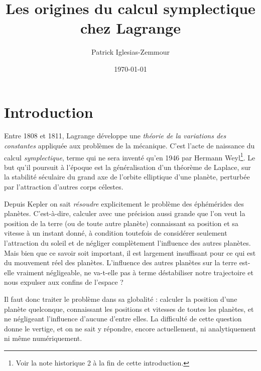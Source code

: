 \documentclass[12pt,paperletter, reqno]{amsart}
\title[Les origines du calcul symplectique]{Les origines du calcul symplectique \\ chez Lagrange}
\author{Patrick Iglesias-Zemmour}
\date{\today}
\theoremstyle{plain}
\theoremstyle{remark}
\begin{document}
  
  \maketitle
  
  
  \section*{Introduction}
  
  Entre 1808 et 1811,
  Lagrange développe une \emph{théorie de la variations des constantes} appliquée aux problèmes de la mécanique.
  C'est l'acte de naissance du calcul \emph{symplectique},
  terme qui ne sera inventé qu'en 1946 par Hermann Weyl\footnote{Voir la note historique 2 à la fin de cette introduction.}.
  Le but qu'il poursuit à l'époque est la généralisation d'un théorème de Laplace,
  sur la stabilité séculaire du grand axe de l'orbite elliptique d'une planète,
  perturbée par l'attraction d'autres corps célestes.
  
  Depuis Kepler on sait \emph{résoudre} explicitement le problème des éphémérides des planètes.
  C'est-à-dire,
  calculer avec une précision aussi grande que l'on veut la position de la terre (ou de toute autre planète) connaissant sa position et sa vitesse à un instant donné,
  à condition toutefois de considérer seulement l'attraction du soleil et de négliger complètement l'influence des autres planètes.
  Mais bien que ce savoir soit important,
  il est largement insuffisant pour ce qui est du mouvement réel des planètes.
  L'influence des autres planètes sur la terre est-elle vraiment négligeable,
  ne va-t-elle pas à terme déstabiliser notre trajectoire et nous expulser aux confins de l'espace ?
  
  Il faut donc traiter le problème dans sa globalité :
  calculer la position d'une planète quelconque,
  connaissant les positions et vitesses de toutes les planètes,
  et ne négligeant l'influence d'aucune d'entre elles.
  La difficulté de cette question donne le vertige,
  et on ne sait y répondre,
  encore actuellement,
  ni analytiquement ni même numériquement.
  
\end{document}
